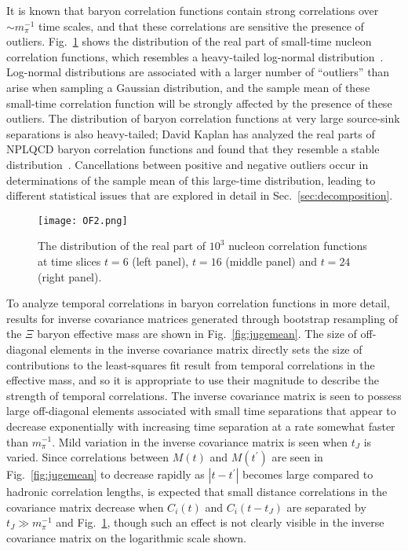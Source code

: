 It is known that baryon correlation functions contain strong correlations over $\sim m_\pi^{-1}$ time scales, and that these correlations are sensitive the presence of outliers.
Fig.~\ref{fig:ReCdist} shows the distribution of the real part of small-time nucleon correlation functions,
which resembles a heavy-tailed log-normal distribution~\cite{DeGrand:2012ik}.
Log-normal distributions are associated with a larger number of ``outliers'' than arise when sampling a Gaussian distribution,
and the sample mean of these small-time correlation function will be strongly affected by the presence of these outliers.
The distribution of baryon correlation functions at very large source-sink separations is also heavy-tailed;
David Kaplan has analyzed the real parts of NPLQCD baryon correlation functions and found that they resemble a stable distribution~\cite{davidkaplanLuschertalk}.
Cancellations between positive and negative outliers occur in determinations of the sample mean of this large-time distribution,
leading to different statistical issues that are explored in detail in Sec.~\ref{sec:decomposition}.

%
\begin{figure}[!ht]
	\texttt{[image: OF2.png]}
	\caption{
	\label{fig:ReCdist} 
	The distribution of the real part of
	$10^3$ nucleon correlation functions at time slices $t=6$ (left panel), $t=16$ (middle panel) and $t=24$ (right panel). 
	}		
\end{figure}
%

To analyze temporal correlations in baryon correlation functions in more detail,
results for inverse covariance matrices generated through bootstrap resampling of the $\Xi$ baryon effective mass are shown in Fig.~\ref{fig:jugemean}.
The size of off-diagonal elements in the inverse covariance matrix directly sets the size of contributions to the least-squares fit result 
from temporal correlations in the effective mass,
and so it is appropriate to use their magnitude to describe the strength of temporal correlations.
The inverse covariance matrix is seen to possess large off-diagonal elements associated with small time separations
that appear to decrease exponentially with increasing time separation at a rate somewhat faster than $m_\pi^{-1}$.
Mild variation in the inverse covariance matrix is seen when $t_J$ is varied.
Since correlations between $M(t)$ and $M(t^\prime)$ are seen in Fig.~\ref{fig:jugemean} to decrease rapidly as $|t-t^\prime|$ becomes large
compared to hadronic correlation lengths,
is expected that small distance correlations in the covariance matrix decrease
when $C_i(t)$ and $C_i(t-t_J)$ are separated by $t_J \gg m_\pi^{-1}$ and Fig.~\ref{fig:ReCdist},
though such an effect is not clearly visible in the inverse covariance matrix on the logarithmic scale shown.


